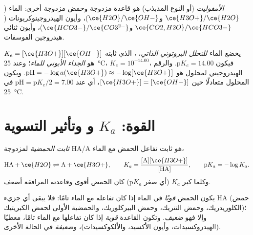 \begin{definition}[الأمفوليت]\label{def:b1:predominant-reaction:ampholyte}
\emph{الأمفوليت} (أو النوع المذبذب) هو قاعدة
مزدوجة وحمض مزدوجة أخرى: الماء ($\ce{H3O+}/\ce{H2O}$
و$\ce{H2O}/\ce{OH-}$)، وأيون الهيدروجينوكربونات ($\ce{CO2,H2O}/\ce{HCO3-}$
و$\ce{HCO3-}/\ce{CO3^{2-}}$)، وأيون ثنائي هيدروجين الفوسفات.
\end{definition}

\begin{definition}\label{def:b1:predominant-reaction:autoprotolysis}
يخضع الماء \emph{للتحلل البروتوني الذاتي}،
، الذي ثابته $K_e = [\ce{H3O+}][\ce{OH-}]$ هو
\emph{الجداء الأيوني للماء}؛ وعند
\qty{25}{\celsius}، $K_e = 10^{-14.00}$، فيكون $\mathrm{p}K_e = 14.00$. والرقم الهيدروجيني
لمحلول هو $\mathrm{pH} = -\log a(\ce{H3O+}) \approx -\log[\ce{H3O+}]$.
ويكون المحلول متعادلًا حين $[\ce{H3O+}] = [\ce{OH-}]$، أي عند
$\mathrm{pH} = \mathrm{p}K_e/2 = 7.00$ في \qty{25}{\celsius}.
\end{definition}

\section{القوة: \texorpdfstring{$K_a$}{Ka} و\texorpdfstring{}{pKa} وتأثير التسوية}

\begin{definition}\label{def:b1:predominant-reaction:acidity-constant}
\emph{ثابت الحمضية} لمزدوجة HA/A هو
ثابت تفاعل الحمض مع الماء،
\[
  \mathrm{HA} + \ce{H2O} \rightleftharpoons \mathrm{A} + \ce{H3O+}, \qquad
  K_a = \frac{[\mathrm{A}][\ce{H3O+}]}{[\mathrm{HA}]}, \qquad
  \mathrm{p}K_a = -\log K_a .
\]
وكلما كبر $K_a$ (أي صغر $\mathrm{p}K_a$) كان الحمض أقوى
وقاعدته المرافقة أضعف.
\end{definition}

\begin{definition}\label{def:b1:predominant-reaction:strong-acid}
يكون الحمض \emph{قويًا} في الماء إذا كان تفاعله مع
الماء تامًا: فلا يبقى أي جزيء HA (حمض الكلوريدريك، وحمض النتريك، وحمض
البيركلوريك، والحمضية الأولى لحمض الكبريتيك)؛ وإلا فهو
\emph{ضعيف}. وتكون القاعدة \emph{قوية}
إذا كان تفاعلها مع الماء تامًا، معطيًا  (الهيدروكسيدات،
وأيون الأكسيد، والألكوكسيدات)، و\emph{ضعيفة} في الحالة الأخرى.
\end{definition}

